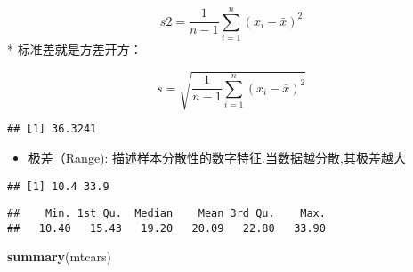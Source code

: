 \documentclass[]{book}
\newenvironment{Shaded}{\begin{snugshade}}{\end{snugshade}}
\newcommand{\KeywordTok}[1]{\textcolor[rgb]{0.13,0.29,0.53}{\textbf{#1}}}
\newcommand{\NormalTok}[1]{#1}
\newcommand{\OperatorTok}[1]{\textcolor[rgb]{0.81,0.36,0.00}{\textbf{#1}}}
\providecommand{\tightlist}{%
  \setlength{\itemsep}{0pt}\setlength{\parskip}{0pt}}
\begin{document}
\[s2=\frac{1}{n-1}\sum ^n _{i=1} (x_i-\bar{x})^2\] *
标准差就是方差开方：

\[s=\sqrt{\frac{1}{n-1}\sum ^n _{i=1} (x_i-\bar{x})^2}\]

\begin{Shaded}
\end{Shaded}

\begin{verbatim}
## [1] 36.3241
\end{verbatim}

\begin{itemize}
\tightlist
\item
  极差（Range): 描述样本分散性的数字特征.当数据越分散,其极差越大
\end{itemize}

\begin{Shaded}
\end{Shaded}

\begin{verbatim}
## [1] 10.4 33.9
\end{verbatim}

\begin{Shaded}
\end{Shaded}

\begin{verbatim}
##    Min. 1st Qu.  Median    Mean 3rd Qu.    Max. 
##   10.40   15.43   19.20   20.09   22.80   33.90
\end{verbatim}

\begin{Shaded}
\begin{Highlighting}[]
\KeywordTok{summary}\NormalTok{(mtcars)}
\end{Highlighting}
\end{Shaded}
\end{document}
